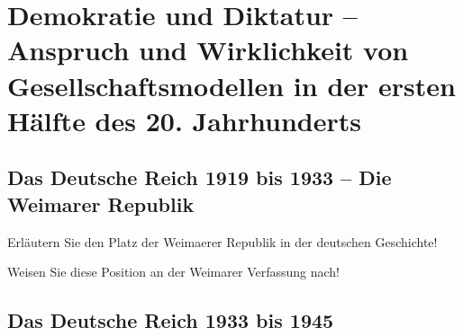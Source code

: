 \part{Demokratie und Diktatur -- Anspruch und Wirklichkeit von
Gesellschaftsmodellen in der ersten Hälfte des 20. Jahrhunderts}
\label{prt:dem-dikt}

\chapter{Das Deutsche Reich 1919 bis 1933 -- Die Weimarer Republik}
\label{chp:weim-rep}

\begin{aufgabe}
Erläutern Sie den Platz der Weimaerer Republik in der deutschen
Geschichte!

Weisen Sie diese Position an der Weimarer Verfassung nach!
\end{aufgabe}











\chapter{Das Deutsche Reich 1933 bis 1945}
\label{chp:drittes-reich}








\endinput
